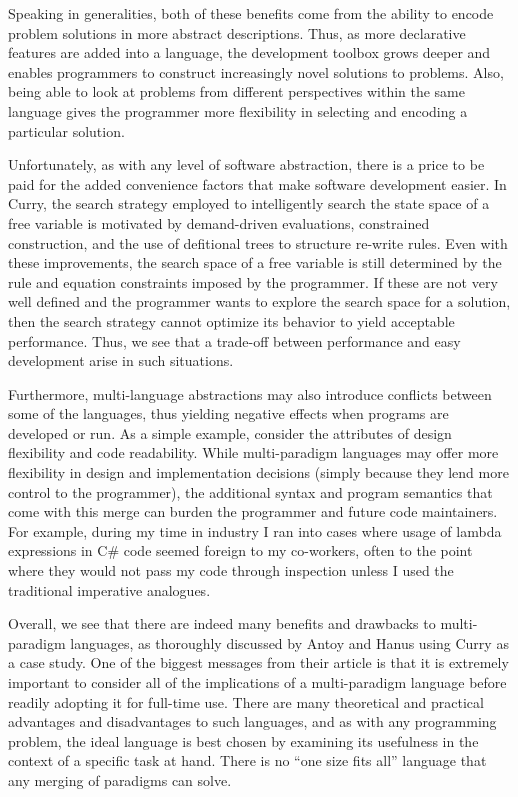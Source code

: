 \documentclass[12pt,letterpaper]{article}
\begin{document}
Speaking in generalities, both of these benefits come from the ability to encode problem solutions in more abstract
descriptions. Thus, as more declarative features are added into a language, the development toolbox
grows deeper and enables programmers to construct increasingly novel solutions to problems. Also, being able 
to look at problems from different perspectives within the same language gives the programmer more 
flexibility in selecting and encoding a particular solution. 

Unfortunately, as with any level of software abstraction, there is a price to be paid for the added 
convenience factors that make software development easier. In Curry, the search strategy employed 
to intelligently search the state space of a free variable is motivated by demand-driven evaluations, 
constrained construction, and the use of defitional trees to structure re-write rules. Even with
these improvements, the search space of a free variable is still determined by the rule and equation
constraints imposed by the programmer. If these are not very well defined and the programmer wants to 
explore the search space for a solution, then the search strategy cannot optimize its behavior to yield
acceptable performance. Thus, we see that a trade-off between performance and easy development arise
in such situations.

Furthermore, multi-language abstractions may also introduce conflicts between some of the languages, thus
yielding negative effects when programs are developed or run. As a simple example, consider the attributes of design 
flexibility and code readability. While multi-paradigm languages may offer more flexibility in design
and implementation decisions (simply because they lend more control to the programmer), the additional
syntax and program semantics that come with this merge can burden the 
programmer and future code maintainers. For example, during my time in industry I ran into cases where 
usage of lambda expressions in C\# code seemed foreign to my co-workers, often to the point where they 
would not pass my code through inspection unless I used the traditional imperative analogues. 

Overall, we see that there are indeed many benefits and drawbacks to multi-paradigm languages, as thoroughly
discussed by Antoy and Hanus using Curry as a case study. One of the biggest messages from their article is that it is extremely important to consider all of the implications of a 
multi-paradigm language before readily adopting it for full-time use. There are many theoretical and 
practical advantages and disadvantages to such languages, and as with any programming problem, 
the ideal language is best chosen by examining its usefulness in the context of a specific task at 
hand. There is no ``one size fits all'' language that any merging of paradigms can solve.



\end{document}
